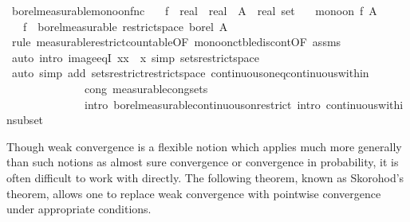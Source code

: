 \documentclass{article}
\theoremstyle{definition}
\begin{document}
\medskip

\begin{isabellebody}
\isamarkupfalse%
\ borel{\isacharunderscore}measurable{\isacharunderscore}mono{\isacharunderscore}on{\isacharunderscore}fnc{\isacharcolon}\isanewline
\ \ \ f\ {\isacharcolon}{\isacharcolon}\ {\isachardoublequoteopen}real\ {\isasymRightarrow}\ real{\isachardoublequoteclose}\ \ A\ {\isacharcolon}{\isacharcolon}\ {\isachardoublequoteopen}real\ set{\isachardoublequoteclose}\isanewline
\ \ \ {\isachardoublequoteopen}mono{\isacharunderscore}on\ f\ A{\isachardoublequoteclose}\isanewline
\ \ \ {\isachardoublequoteopen}f\ {\isasymin}\ borel{\isacharunderscore}measurable\ {\isacharparenleft}restrict{\isacharunderscore}space\ borel\ A{\isacharparenright}{\isachardoublequoteclose}\isanewline
{}\isamarkupfalse%
\ {\isacharparenleft}rule\ measurable{\isacharunderscore}restrict{\isacharunderscore}countable{\isacharbrackleft}OF\ mono{\isacharunderscore}on{\isacharunderscore}ctble{\isacharunderscore}discont{\isacharbrackleft}OF\ assms{\isacharbrackright}{\isacharbrackright}{\isacharparenright}\isanewline
\ \ \isamarkupfalse%
\ {\isacharparenleft}auto\ intro{\isacharbang}{\isacharcolon}\ image{\isacharunderscore}eqI{\isacharbrackleft}\ x{\isacharequal}{\isachardoublequoteopen}{\isacharbraceleft}x{\isacharbraceright}{\isachardoublequoteclose}\ \ x{\isacharbrackright}\ simp{\isacharcolon}\ sets{\isacharunderscore}restrict{\isacharunderscore}space{\isacharparenright}\isanewline
\ \ \isamarkupfalse%
\ {\isacharparenleft}auto\ simp\ add{\isacharcolon}\ sets{\isacharunderscore}restrict{\isacharunderscore}restrict{\isacharunderscore}space\ continuous{\isacharunderscore}on{\isacharunderscore}eq{\isacharunderscore}continuous{\isacharunderscore}within\isanewline
\ \ \ \ \ \ \ \ \ \ \ \ \ \ cong{\isacharcolon}\ measurable{\isacharunderscore}cong{\isacharunderscore}sets\ \isanewline
\ \ \ \ \ \ \ \ \ \ \ \ \ \ intro{\isacharbang}{\isacharcolon}\ borel{\isacharunderscore}measurable{\isacharunderscore}continuous{\isacharunderscore}on{\isacharunderscore}restrict\ intro{\isacharcolon}\ continuous{\isacharunderscore}within{\isacharunderscore}subset{\isacharparenright}\isanewline
\ \ \isamarkupfalse%
\end{isabellebody}

\medskip

Though weak convergence is a flexible notion which applies much more generally than such notions as almost sure convergence or convergence in probability, it is often difficult to work with directly. The following theorem, known as Skorohod's theorem, allows one to replace weak convergence with pointwise convergence under appropriate conditions.
\end{document}
